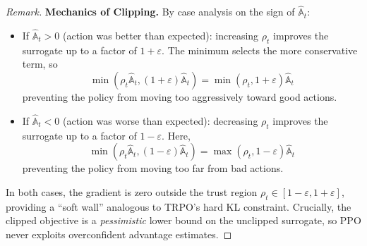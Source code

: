 \documentclass[11pt, letterpaper]{article}
\newenvironment{remark}
    {\renewcommand\qedsymbol{\(\blacksquare\)}\begin{proof}[Remark]}
    {\end{proof}}
\begin{document}
\begin{remark}
    \textbf{Mechanics of Clipping.} By case analysis on the sign of \(\widehat{\mathbb{A}}_t\): 
    \begin{itemize}
        \item If \(\widehat{\mathbb{A}}_t > 0\) (action was better than expected): increasing \(\rho_t\) improves the surrogate up to a factor of \(1+\varepsilon\). The minimum selects the more conservative term, so 
        \[
            \min(\rho_t \widehat{\mathbb{A}}_t, (1+\varepsilon)\widehat{\mathbb{A}}_t) = \min(\rho_t, 1+\varepsilon) \widehat{\mathbb{A}}_t
        \]
        preventing the policy from moving too aggressively toward good actions. 
        \item If \(\widehat{\mathbb{A}}_t < 0\) (action was worse than expected): decreasing \(\rho_t\) improves the surrogate up to a factor of \(1 - \varepsilon\). Here, 
        \[
            \min(\rho_t \widehat{\mathbb{A}}_t, (1-\varepsilon)\widehat{\mathbb{A}}_t) = \max(\rho_t, 1-\varepsilon) \widehat{\mathbb{A}}_t
        \]
        preventing the policy from moving too far from bad actions. 
    \end{itemize}
    In both cases, the gradient is zero outside the trust region \(\rho_t \in [1-\varepsilon, 1+\varepsilon]\), providing a ``soft wall'' analogous to TRPO's hard KL constraint. Crucially, the clipped objective is a \textit{pessimistic} lower bound on the unclipped surrogate, so PPO never exploits overconfident advantage estimates.


\end{remark}
\end{document}

